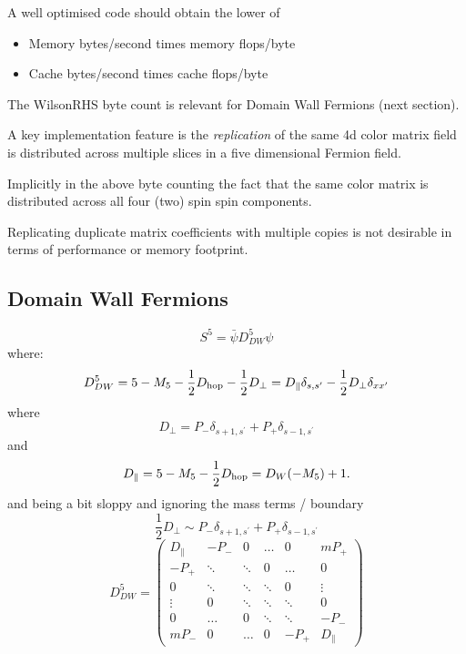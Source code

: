 \documentclass[letter,10pt]{report}
\begin{document}
A well optimised code should obtain the lower of
\begin{itemize}
  \item Memory bytes/second times memory flops/byte
  \item Cache bytes/second times  cache flops/byte
  \end{itemize}

The WilsonRHS byte count is relevant for Domain Wall Fermions (next section).

A key implementation feature is the \emph{replication} of the same 4d color matrix field is
distributed across multiple slices in a five dimensional Fermion field.

Implicitly in the above byte counting the
fact that the same color matrix is distributed across all four (two) spin spin components.

Replicating duplicate matrix coefficients with multiple copies is not desirable in terms of performance
or memory footprint.

\subsection{Domain Wall Fermions}

\begin{equation}
S^5 = \bar{\psi} D^5_{DW} \psi
\end{equation}
where:
\begin{equation}
D^5_{DW} = 5-M_5 - \frac{1}{2} D_{\rm hop} - \frac{1}{2} D_{\perp}
=
  D_\parallel \delta_{s,s^\prime}
- \frac{1}{2} D_{\perp}\delta_{xx'}
\end{equation}
where 
$$ D_\perp =  P_- \delta_{s+1,s^\prime} + P_+ \delta_{s-1,s^\prime}
$$
and
$$
D_{\parallel} = 5 - M_5 - \frac{1}{2} D_{\rm hop} = D_W(-M_5)+1 .
$$
and being a bit sloppy and ignoring the mass terms / boundary 
$$
\frac{1}{2} D_\perp \sim P_- \delta_{s+1,s^\prime}
                   + P_+ \delta_{s-1,s^\prime}
$$
\begin{equation}
D^5_{DW} = 
\left(
\begin{array}{cccccc}
D_\parallel & - P_-  &  0      & \ldots & 0 & m P_+ \\
-P_+  & \ddots &  \ddots & 0      & \ldots &0 \\
0     & \ddots &  \ddots & \ddots & 0      &\vdots \\
\vdots& 0      &  \ddots & \ddots & \ddots & 0\\
0     & \ldots &    0    &  \ddots& \ddots & -P_- \\
m P_- & 0      & \ldots  &  0     & -P_+   & D_\parallel
\end{array}
\right)
\end{equation}
\end{document}
